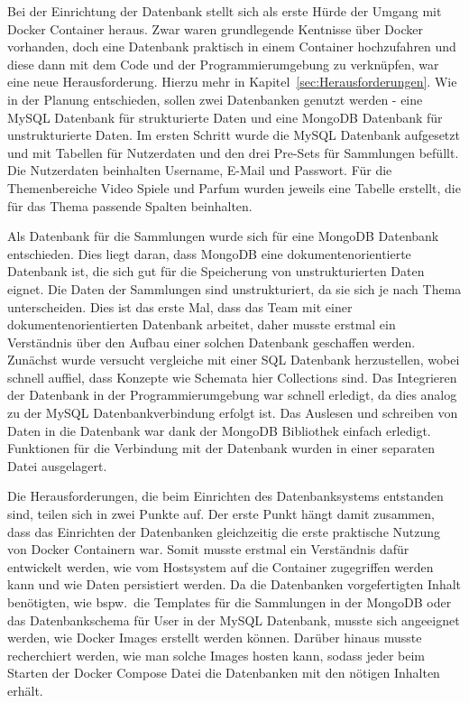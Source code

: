 Bei der Einrichtung der Datenbank stellt sich als erste Hürde der Umgang mit Docker Container heraus.
Zwar waren grundlegende Kentnisse über Docker vorhanden, doch eine Datenbank praktisch in einem Container hochzufahren und diese dann mit dem Code und der Programmierumgebung zu verknüpfen, war eine neue Herausforderung.
Hierzu mehr in Kapitel~\ref{sec:Herausforderungen}.
Wie in der Planung entschieden, sollen zwei Datenbanken genutzt werden - eine MySQL Datenbank für strukturierte Daten und eine MongoDB Datenbank für unstrukturierte Daten.
Im ersten Schritt wurde die MySQL Datenbank aufgesetzt und mit Tabellen für Nutzerdaten und den drei Pre-Sets für Sammlungen befüllt.
Die Nutzerdaten beinhalten Username, E-Mail und Passwort.
Für die Themenbereiche Video Spiele und Parfum wurden jeweils eine Tabelle erstellt, die für das Thema passende Spalten beinhalten.

Als Datenbank für die Sammlungen wurde sich für eine MongoDB Datenbank entschieden.
Dies liegt daran, dass MongoDB eine dokumentenorientierte Datenbank ist, die sich gut für die Speicherung von unstrukturierten Daten eignet.
Die Daten der Sammlungen sind unstrukturiert, da sie sich je nach Thema unterscheiden.
Dies ist das erste Mal, dass das Team mit einer dokumentenorientierten Datenbank arbeitet, daher musste erstmal ein Verständnis über den Aufbau einer solchen Datenbank geschaffen werden.
Zunächst wurde versucht vergleiche mit einer SQL Datenbank herzustellen, wobei schnell auffiel, dass Konzepte wie Schemata hier Collections sind.
Das Integrieren der Datenbank in der Programmierumgebung war schnell erledigt, da dies analog zu der MySQL Datenbankverbindung erfolgt ist.
Das Auslesen und schreiben von Daten in die Datenbank war dank der MongoDB Bibliothek einfach erledigt.
Funktionen für die Verbindung mit der Datenbank wurden in einer separaten Datei ausgelagert.

Die Herausforderungen, die beim Einrichten des Datenbanksystems entstanden sind, teilen sich in zwei Punkte auf.
Der erste Punkt hängt damit zusammen, dass das Einrichten der Datenbanken gleichzeitig die erste praktische Nutzung von Docker Containern war.
Somit musste erstmal ein Verständnis dafür entwickelt werden, wie vom Hostsystem auf die Container zugegriffen werden kann und wie Daten persistiert werden.
Da die Datenbanken vorgefertigten Inhalt benötigten, wie bspw.\ die Templates für die Sammlungen in der MongoDB oder das Datenbankschema für User in der MySQL Datenbank, musste sich angeeignet werden, wie Docker Images erstellt werden können.
Darüber hinaus musste recherchiert werden, wie man solche Images hosten kann, sodass jeder beim Starten der Docker Compose Datei die Datenbanken mit den nötigen Inhalten erhält.

